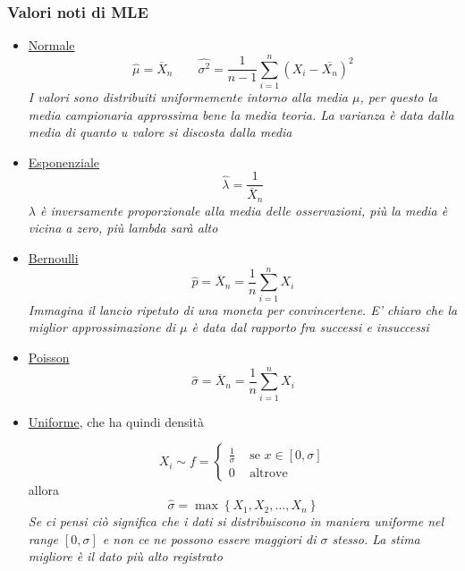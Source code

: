 \subsubsection*{Valori noti di MLE}
\begin{itemize}
  \item \underline{Normale} 
    \[
          \hat{\mu } = \overline{X}_n  \quad \quad \hat{\sigma ^2 } = \frac{1}{n-1} \sum_{i=1}^{n} \left(X_i - \overline{X_n}\right)^2 
    \]
    \textit{I valori sono distribuiti uniformemente intorno alla media $ \mu  $, per questo la media campionaria approssima bene la media teoria. La varianza è data dalla media di quanto u valore si discosta dalla media}
    \item \underline{Esponenziale}
      \[
      \hat{\lambda } = \frac{1}{\overline{X}_n}
      \]
      \textit{$ \lambda $ è inversamente proporzionale alla media delle osservazioni, più la media è vicina a zero, più lambda sarà alto}
    \item \underline{Bernoulli}
      \[
       \hat{p} = \overline{X} _n = \frac{1}{n} \sum_{i=1}^{n} X_i
      \]
      \textit{Immagina il lancio ripetuto di una moneta per convincertene. E' chiaro che la miglior approssimazione di $ \mu  $ è data dal rapporto fra successi e insuccessi}
    \item \underline{Poisson}
      \[
      \hat{\sigma }  = \overline{X} _n = \frac{1}{n} \sum_{i=1}^{n} X_i
      \]
      \item \underline{Uniforme}, che ha quindi densità
         
        \[
        X_i \sim f = \begin{cases}
          \frac{1}{\sigma } & \text{ se } x \in \left[0, \sigma \right]\\ 
          0 & \text{ altrove }
        \end{cases}
        \]
         allora 
         \[
           \hat{\sigma } = \operatorname{max} \left\{X_1, X_2,\ldots ,X_n\right\}
         \]
         \textit{Se ci pensi ciò significa che i dati si distribuiscono in maniera uniforme nel range $ \left[0, \sigma \right] $ e non ce ne possono essere maggiori di $ \sigma  $ stesso. La stima migliore è il dato più alto registrato}
\end{itemize}
